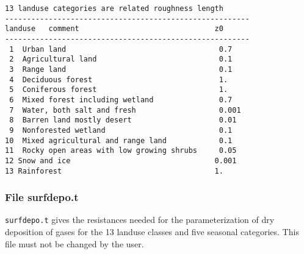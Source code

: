 \documentclass{egu}                  %
\begin{document}
\begin{footnotesize}
\begin{verbatim}
13 landuse categories are related roughness length
--------------------------------------------------------
landuse   comment                               z0
--------------------------------------------------------
 1	Urban land                                   0.7	
 2	Agricultural land                            0.1
 3	Range land                                   0.1
 4	Deciduous forest                             1.
 5	Coniferous forest                            1.
 6	Mixed forest including wetland               0.7	
 7	Water, both salt and fresh                   0.001
 8	Barren land mostly desert                    0.01
 9	Nonforested wetland                          0.1
10	Mixed agricultural and range land            0.1
11	Rocky open areas with low growing shrubs     0.05
12 Snow and ice                                 0.001
13 Rainforest                                   1.
\end{verbatim}
\end{footnotesize}

\newpage

\subsubsection{File surfdepo.t}
\verb|surfdepo.t| gives the resistances needed for the parameterization of dry deposition of gases for the 13 landuse classes and five seasonal categories.
This file must not be changed by the user.\par
 
\end{document}
